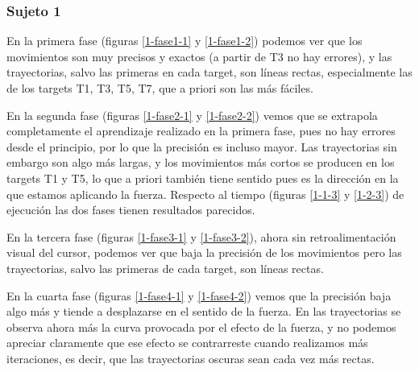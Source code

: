 \documentclass[a4paper,11pt, oneside]{book}
\begin{document}
\subsubsection{Sujeto 1}

En la primera fase (figuras \ref{1-fase1-1} y \ref{1-fase1-2}) podemos ver que los movimientos son muy precisos y exactos (a partir de T3 no hay errores), y las trayectorias, salvo las primeras en cada target, son líneas rectas, especialmente las de los targets T1, T3, T5, T7, que a priori son las más fáciles.

En la segunda fase (figuras \ref{1-fase2-1} y \ref{1-fase2-2}) vemos que se extrapola completamente el aprendizaje realizado en la primera fase, pues no hay errores desde el principio, por lo que la precisión es incluso mayor. Las trayectorias sin embargo son algo más largas, y los movimientos más cortos se producen en los targets T1 y T5, lo que a priori también tiene sentido pues es la dirección en la que estamos aplicando la fuerza. Respecto al tiempo (figuras \ref{1-1-3} y \ref{1-2-3}) de ejecución las dos fases tienen resultados parecidos.

En la tercera fase (figuras \ref{1-fase3-1} y \ref{1-fase3-2}), ahora sin retroalimentación visual del cursor, podemos ver que baja la precisión de los movimientos pero las trayectorias, salvo las primeras de cada target, son líneas rectas.

En la cuarta fase (figuras \ref{1-fase4-1} y \ref{1-fase4-2}) vemos que la precisión baja algo más y tiende a desplazarse en el sentido de la fuerza. En las trayectorias se observa ahora más la curva provocada por el  efecto de la fuerza, y no podemos apreciar claramente que ese efecto se contrarreste cuando realizamos más iteraciones, es decir, que las trayectorias oscuras sean cada vez más rectas.
\end{document}
